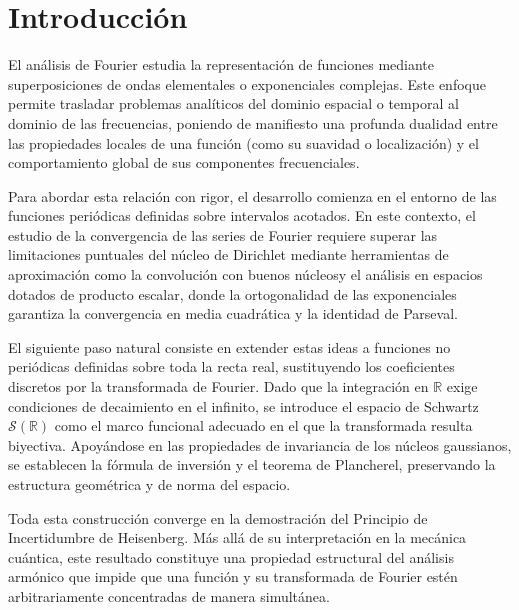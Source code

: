 \documentclass[12pt]{article}
\theoremstyle{plain}
\theoremstyle{definition}
\numberwithin{equation}{section}
\begin{document}


\tableofcontents

\newpage 

\pagestyle{plain} 

\section{Introducción}
    El análisis de Fourier estudia la representación de funciones mediante superposiciones de ondas elementales o exponenciales complejas. Este enfoque permite trasladar problemas analíticos del dominio espacial o temporal al dominio de las frecuencias, poniendo de manifiesto una profunda dualidad entre las propiedades locales de una función (como su suavidad o localización) y el comportamiento global de sus componentes frecuenciales.

    Para abordar esta relación con rigor, el desarrollo comienza en el entorno de las funciones periódicas definidas sobre intervalos acotados. En este contexto, el estudio de la convergencia de las series de Fourier requiere superar las limitaciones puntuales del núcleo de Dirichlet mediante herramientas de aproximación como la convolución con buenos núcleosy el análisis en espacios dotados de producto escalar, donde la ortogonalidad de las exponenciales garantiza la convergencia en media cuadrática y la identidad de Parseval.

    El siguiente paso natural consiste en extender estas ideas a funciones no periódicas definidas sobre toda la recta real, sustituyendo los coeficientes discretos por la transformada de Fourier. Dado que la integración en $\mathbb{R}$ exige condiciones de decaimiento en el infinito, se introduce el espacio de Schwartz $\mathcal{S}(\mathbb{R})$ como el marco funcional adecuado en el que la transformada resulta biyectiva. Apoyándose en las propiedades de invariancia de los núcleos gaussianos, se establecen la fórmula de inversión y el teorema de Plancherel, preservando la estructura geométrica y de norma del espacio.

    Toda esta construcción converge en la demostración del Principio de Incertidumbre de Heisenberg. Más allá de su interpretación en la mecánica cuántica, este resultado constituye una propiedad estructural del análisis armónico que impide que una función y su transformada de Fourier estén arbitrariamente concentradas de manera simultánea.
\newpage
\end{document}
